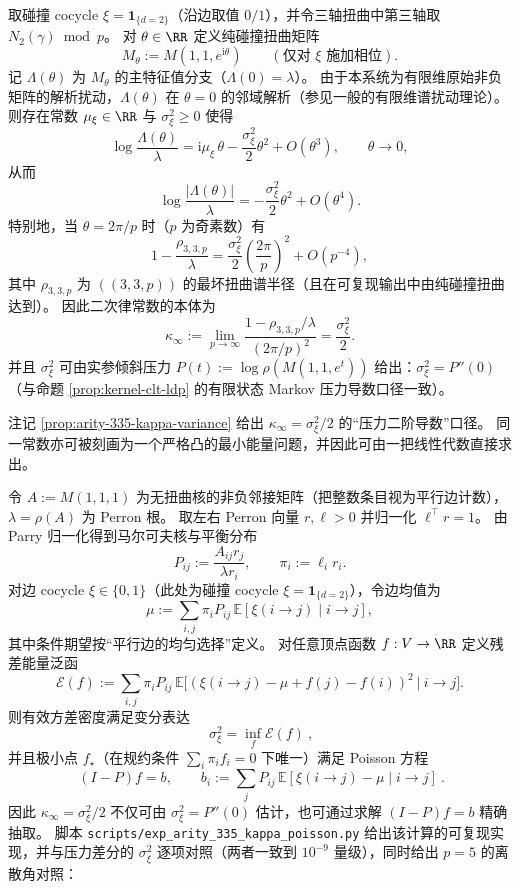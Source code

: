 \begin{remark}\label{prop:arity-335-kappa-variance}
取碰撞 cocycle \(\xi=\mathbf{1}_{\{d=2\}}\)（沿边取值 \(0/1\)），并令三轴扭曲中第三轴取 \(N_2(\gamma)\bmod p\)。
对 \(\theta\in\RR\) 定义纯碰撞扭曲矩阵
$$
M_\theta:=M(1,1,e^{\mathrm{i}\theta})\qquad(\text{仅对 }\xi\text{ 施加相位}).
$$
记 \(\Lambda(\theta)\) 为 \(M_\theta\) 的主特征值分支（\(\Lambda(0)=\lambda\)）。
由于本系统为有限维原始非负矩阵的解析扰动，\(\Lambda(\theta)\) 在 \(\theta=0\) 的邻域解析（参见一般的有限维谱扰动理论）。
则存在常数 \(\mu_\xi\in\RR\) 与 \(\sigma_\xi^2\ge 0\) 使得
$$
\log\frac{\Lambda(\theta)}{\lambda}
=
\mathrm{i}\mu_\xi\,\theta-\frac{\sigma_\xi^2}{2}\theta^2+O(\theta^3),
\qquad \theta\to 0,
$$
从而
$$
\log\frac{|\Lambda(\theta)|}{\lambda}
=
-\frac{\sigma_\xi^2}{2}\theta^2+O(\theta^4).
$$
特别地，当 \(\theta=2\pi/p\) 时（\(p\) 为奇素数）有
$$
1-\frac{\rho_{3,3,p}}{\lambda}
=
\frac{\sigma_\xi^2}{2}\left(\frac{2\pi}{p}\right)^2
+
O\!\left(p^{-4}\right),
$$
其中 \(\rho_{3,3,p}\) 为 \( ((3,3,p))\) 的最坏扭曲谱半径（且在可复现输出中由纯碰撞扭曲达到）。
因此二次律常数的本体为
$$
\kappa_\infty:=\lim_{p\to\infty}\frac{1-\rho_{3,3,p}/\lambda}{(2\pi/p)^2}
=\frac{\sigma_\xi^2}{2}.
$$
并且 \(\sigma_\xi^2\) 可由实参倾斜压力
\(
P(t):=\log\rho(M(1,1,e^t))
\)
给出：\(\sigma_\xi^2=P''(0)\)（与命题 \ref{prop:kernel-clt-ldp} 的有限状态 Markov 压力导数口径一致）。
\end{remark}

\begin{remark}\label{rem:arity-335-kappa-poisson}
注记 \ref{prop:arity-335-kappa-variance} 给出 \(\kappa_\infty=\sigma_\xi^2/2\) 的“压力二阶导数”口径。
同一常数亦可被刻画为一个严格凸的最小能量问题，并因此可由一把线性代数直接求出。
\par
令 \(A:=M(1,1,1)\) 为无扭曲核的非负邻接矩阵（把整数条目视为平行边计数），\(\lambda=\rho(A)\) 为 Perron 根。
取左右 Perron 向量 \(r,\ell>0\) 并归一化 \(\ell^\top r=1\)。
由 Parry 归一化得到马尔可夫核与平衡分布
$$
P_{ij}:=\frac{A_{ij}r_j}{\lambda r_i},\qquad \pi_i:=\ell_i r_i.
$$
对边 cocycle \(\xi\in\{0,1\}\)（此处为碰撞 cocycle \(\xi=\mathbf{1}_{\{d=2\}}\)），令边均值为
$$
\mu:=\sum_{i,j}\pi_iP_{ij}\,\mathbb{E}[\xi(i\to j)\mid i\to j],
$$
其中条件期望按“平行边的均匀选择”定义。
对任意顶点函数 \(f:V\to\RR\) 定义残差能量泛函
$$
\mathcal{E}(f):=\sum_{i,j}\pi_iP_{ij}\,\mathbb{E}\Big[(\xi(i\to j)-\mu+f(j)-f(i))^2\ \big|\ i\to j\Big].
$$
则有效方差密度满足变分表达
$$
\boxed{\ \sigma_\xi^2=\inf_f\mathcal{E}(f)\ },
$$
并且极小点 \(f_\star\)（在规约条件 \(\sum_i\pi_if_i=0\) 下唯一）满足 Poisson 方程
$$
\boxed{\ (I-P)f=b,\qquad b_i:=\sum_jP_{ij}\,\mathbb{E}[\xi(i\to j)-\mu\mid i\to j]\ }.
$$
因此 \(\kappa_\infty=\sigma_\xi^2/2\) 不仅可由 \(\sigma_\xi^2=P''(0)\) 估计，也可通过求解 \((I-P)f=b\) 精确抽取。
脚本 \texttt{scripts/exp\_arity\_335\_kappa\_poisson.py} 给出该计算的可复现实现，并与压力差分的 \(\sigma_\xi^2\) 逐项对照（两者一致到 \(10^{-9}\) 量级），同时给出 \(p=5\) 的离散角对照：

\end{remark}

